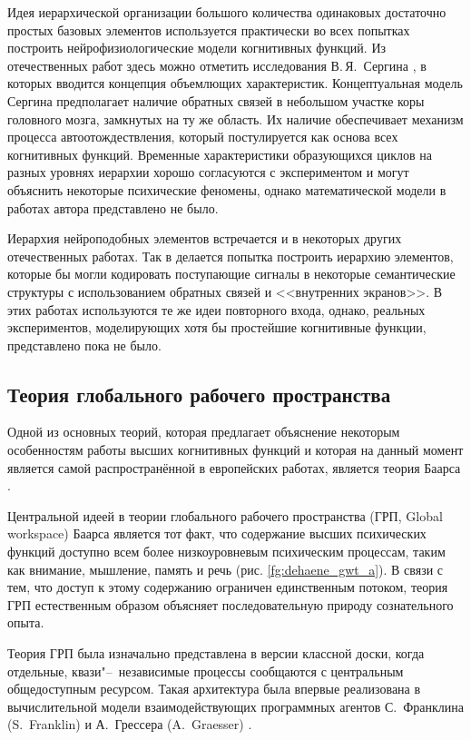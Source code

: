 Идея иерархической организации большого количества одинаковых достаточно простых базовых элементов используется практически во всех попытках построить нейрофизиологические модели когнитивных функций. Из отечественных работ здесь можно отметить исследования В.\,Я.~Сергина \cite{Sergin2008,Sergin2009,Sergin2011}, в которых вводится концепция объемлющих характеристик. Концептуальная модель Сергина предполагает наличие обратных связей в небольшом участке коры головного мозга, замкнутых на ту же область. Их наличие обеспечивает механизм процесса автоотождествления, который постулируется как основа всех когнитивных функций. Временные характеристики образующихся циклов на разных уровнях иерархии хорошо согласуются с экспериментом и могут объяснить некоторые психические феномены, однако математической модели в работах автора представлено не было.

Иерархия нейроподобных элементов встречается и в некоторых других отечественных работах. Так в \cite{Vartanov2011,Chernavsky2012} делается попытка построить иерархию элементов, которые бы могли кодировать поступающие сигналы в некоторые семантические структуры с использованием обратных связей и <<внутренних экранов>>. В этих работах используются те же идеи повторного входа, однако, реальных экспериментов, моделирующих хотя бы простейшие когнитивные функции, представлено пока не было.

\subsection{Теория глобального рабочего пространства}\label{subsect1_2_1}

Одной из основных теорий, которая предлагает объяснение некоторым особенностям работы высших когнитивных функций и которая на данный момент является самой распространённой в европейских работах, является теория Баарса \cite{Baars1988,Baars2005}.

Центральной идеей в теории глобального рабочего пространства (ГРП, Global workspace) Баарса является тот факт, что содержание высших психических функций доступно всем более низкоуровневым психическим процессам, таким как внимание, мышление, память и речь (рис. \ref{fg:dehaene_gwt_a}). В связи с тем, что доступ к этому содержанию ограничен единственным потоком, теория ГРП естественным образом объясняет последовательную природу сознательного опыта.

Теория ГРП была изначально представлена в версии классной доски, когда отдельные, квази"--~независимые процессы сообщаются с центральным общедоступным ресурсом. Такая архитектура была впервые реализована в вычислительной модели взаимодействующих программных агентов С.~Франклина (S.~Franklin) и А.~Грессера (A.~Graesser) \cite{Franklin1999}.

